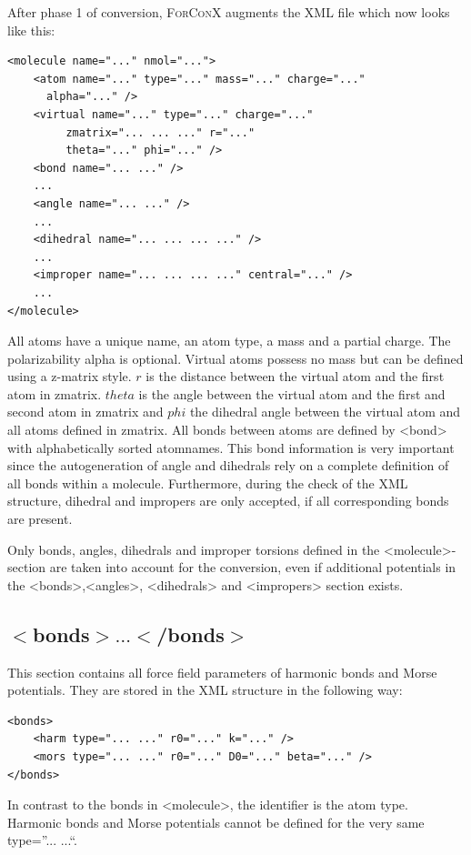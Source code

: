 \documentclass[12pt]{article}
\begin{document}
After phase 1 of conversion, \textsc{ForConX} augments the XML file which now looks like this:
\begin{lstlisting}[basicstyle=\linespread{1.1}\ttfamily\small]
<molecule name="..." nmol="...">
    <atom name="..." type="..." mass="..." charge="..." 
	  alpha="..." />
    <virtual name="..." type="..." charge="..."  
	     zmatrix="... ... ..." r="..." 
	     theta="..." phi="..." />
    <bond name="... ..." />
    ...
    <angle name="... ..." />
    ...
    <dihedral name="... ... ... ..." />
    ...
    <improper name="... ... ... ..." central="..." />
    ...
</molecule>
\end{lstlisting}
All atoms have a unique name, an atom type, a mass and a partial charge. The polarizability alpha is optional.
Virtual atoms possess no mass but can be defined using a z-matrix style. $r$ is the distance between the virtual
atom and the first atom in zmatrix. $theta$ is the angle between the virtual atom and the first and second atom
in zmatrix and $phi$ the dihedral angle between the virtual atom and all atoms defined in zmatrix.
All bonds between atoms are defined by <bond> with alphabetically sorted atomnames.
This bond information is very important since the autogeneration of angle and dihedrals rely on a complete
definition of all bonds within a molecule. Furthermore, during the check of the XML structure, dihedral 
and impropers are only accepted, if all corresponding bonds are present. 

Only bonds, angles, dihedrals and improper torsions defined in the <molecule>-section are taken into 
account for the conversion, even if additional potentials in the <bonds>,<angles>, <dihedrals>
and <impropers> section exists.

\subsection{$<$bonds$> \ldots <$/bonds$>$}
This section contains all force field parameters of harmonic bonds and Morse potentials. They are
stored in the XML structure in the following way:
\begin{lstlisting}[basicstyle=\linespread{1.1}\ttfamily\small]
<bonds>
    <harm type="... ..." r0="..." k="..." />
    <mors type="... ..." r0="..." D0="..." beta="..." />
</bonds>
\end{lstlisting}
In contrast to the bonds in <molecule>, the identifier is the atom type.
Harmonic bonds and Morse potentials cannot be defined for the very same type=''... ...``.
\end{document}
